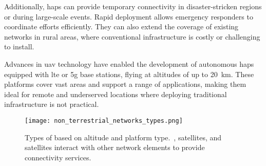 Additionally, \glspl{hap} can provide temporary connectivity in disaster-stricken regions or during large-scale events. Rapid deployment allows emergency responders to coordinate efforts efficiently. They can also extend the coverage of existing networks in rural areas, where conventional infrastructure is costly or challenging to install.

Advances in \gls{uav} technology have enabled the development of autonomous \glspl{hap} equipped with \gls{lte} or \gls{5g} base stations, flying at altitudes of up to \SI{20}{\kilo\meter}. These platforms cover vast areas and support a range of applications, making them ideal for remote and underserved locations where deploying traditional infrastructure is not practical.

\begin{figure}
  \texttt{[image: non\_terrestrial\_networks\_types.png]}
  \caption{Types of  based on altitude and platform type.\ ,  satellites, and  satellites interact with other network elements to provide connectivity services.\ \autocite{alertifyAirbusNTT}}\label{fig:ntn_types}
\end{figure}

